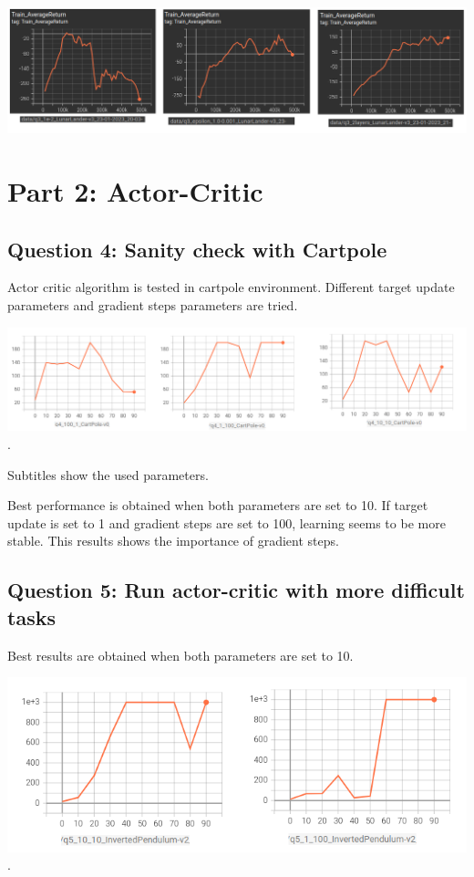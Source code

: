 \documentclass[11pt]{article}
\begin{document}
    \hspace*{-0.5in}
    \includegraphics[scale=1.5]{q3/q3}

    \section{Part 2: Actor-Critic}

    \subsection*{Question 4: Sanity check with Cartpole}

    Actor critic algorithm is tested in cartpole environment.
    Different target update parameters and gradient steps parameters are tried.

    \includegraphics[scale=1.5]{q4/q4}.

    Subtitles show the used parameters.

    Best performance is obtained when both parameters are set to 10.
    If target update is set to 1 and gradient steps are set to 100, learning seems to be more stable.
    This results shows the importance of gradient steps.

    \subsection*{Question 5: Run actor-critic with more difficult tasks}

    Best results are obtained when both parameters are set to 10.

    \includegraphics[scale=2]{q5/q5_inverted_pendulum}.
\end{document}
